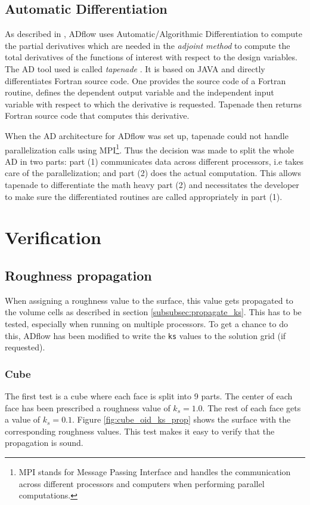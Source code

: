 \subsection{Automatic Differentiation}
As described in \cite{cm1}, ADflow uses Automatic/Algorithmic Differentiation to
compute the partial derivatives which are needed in the \textit{adjoint method}
to compute the total derivatives of the functions of interest with respect to
the design variables. The AD tool used is called \textit{tapenade}
\cite{tapenade}. It is based on JAVA and directly differentiates Fortran source
code. One provides the source code of a Fortran routine, defines the dependent
output variable and the independent input variable with respect to which the
derivative is requested. Tapenade then returns Fortran source code that
computes this derivative.

When the AD architecture for ADflow was set up, tapenade could not handle
parallelization calls using MPI\footnote{MPI stands for Message Passing
Interface and handles the communication across different processors and
computers when performing parallel computations.}. Thus the decision was made to
split the whole AD in two parts: part (1) communicates data across different
processors, i.e takes care of the parallelization; and part (2) does the actual
computation. This allows tapenade to differentiate the math heavy part (2) and
necessitates the developer to make sure the differentiated routines are called
appropriately in part (1).


\section{Verification}

\subsection{Roughness propagation}
\label{subsec:roughness_prop}
When assigning a roughness value to the surface, this value gets propagated to
the volume cells as described in section \ref{subsubsec:propagate_ks}. This has
to be tested, especially when running on multiple processors. To get a chance to
do this, ADflow has been modified to write the \texttt{ks} values to the
solution grid (if requested).

\subsubsection{Cube}
The first test is a cube where each face is split into 9 parts. The center of
each face has been prescribed a roughness value of $k_{s} = 1.0$. The rest of
each face gets a value of $k_{s} = 0.1$. Figure \ref{fig:cube_oid_ks_prop} shows
the surface with the corresponding roughness values. This test makes it easy to
verify that the propagation is sound.

